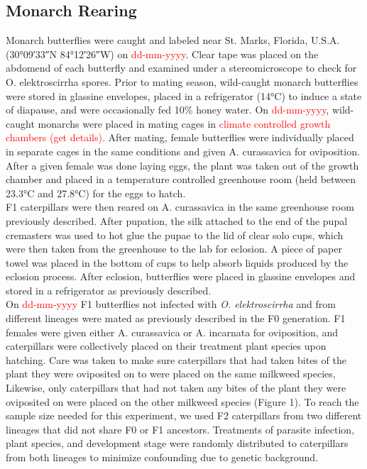 \documentclass{article}
\begin{document}
\begin{multicols}{2}
    \section{Monarch Rearing}
    \indent Monarch butterflies were caught and labeled near St. Marks, Florida, U.S.A. (30°09′33″N 84°12′26″W﻿) on \textcolor{red}{dd-mm-yyyy}. 
    Clear tape was placed on the abdomend of each butterfly and examined under a stereomicroscope to check for O. elektroscirrha spores. 
    Prior to mating season, wild-caught monarch butterflies were stored in glassine envelopes, placed in a refrigerator (14°C) to 
    induce a state of diapause, and were occasionally fed 10\% honey water. On \textcolor{red}{dd-mm-yyyy}, wild-caught monarchs were placed in 
    mating cages in \textcolor{red}{climate controlled growth chambers (get details).} After mating, female butterflies were individually placed 
    in separate cages in the same conditions and given A. curassavica for oviposition. After a given female was done laying eggs, 
    the plant was taken out of the growth chamber and placed in a temperature controlled greenhouse room (held between 23.3°C and 27.8°C) 
    for the eggs to hatch. 
    \\
    \indent F1 caterpillars were then reared on A. curassavica in the same greenhouse room previously described. After pupation, the silk 
    attached to the end of the pupal cremasters was used to hot glue the pupae to the lid of clear solo cups, which were then taken from 
    the greenhouse to the lab for eclosion. A piece of paper towel was placed in the bottom of cups to help absorb liquids produced by the 
    eclosion process. After eclosion, butterflies were placed in glassine envelopes and stored in a refrigerator as previously described.
    \\
    \indent On \textcolor{red}{dd-mm-yyyy} F1 butterflies not infected with \emph{O. elektroscirrha} and from different lineages were mated as previously 
    described in the F0 generation. F1 females were given either A. curassavica or A. incarnata for oviposition, and caterpillars were collectively 
    placed on their treatment plant species upon hatching. Care was taken to make sure caterpillars that had taken bites of the plant they were 
    oviposited on to were placed on the same milkweed species, Likewise, only caterpillars that had not taken any bites of the plant they were 
    oviposited on were placed on the other milkweed species (Figure 1). To reach the sample size needed for this experiment, we used F2 caterpillars 
    from two different lineages that did not share F0 or F1 ancestors. Treatments of parasite infection, plant species, and development stage were 
    randomly distributed to caterpillars from both lineages to minimize confounding due to genetic background.


\end{multicols}
\end{document}
